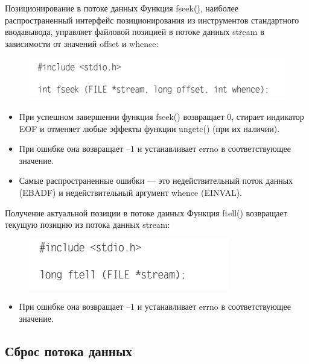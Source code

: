 \documentclass{beamer}
\begin{document}
\begin{frame}{Позиционирование в потоке данных}
Функция fseek(), наиболее распространенный интерфейс позиционирования из инструментов стандартного ввода­вывода,
управляет файловой позицией в потоке данных stream в зависимости от значений offset и whence:
\begin{figure}[h]
\centering
\includegraphics[scale=0.6]{images/lec05-pic22.png}
\end{figure}
\begin{itemize}
\item При успешном завершении функция fseek() возвращает 0, стирает индикатор EOF и отменяет любые эффекты функции ungetc() (при их наличии). 
\item При ошибке она возвращает –1 и устанавливает errno в соответствующее значение. 
\item Самые распространенные ошибки — это недействительный поток данных (EBADF) и недействительный аргумент whence (EINVAL).
\end{itemize}
\end{frame}

\begin{frame}{Получение актуальной позиции в потоке данных}
Функция ftell() возвращает текущую позицию из потока данных stream:
\begin{figure}[h]
\centering
\includegraphics[scale=0.6]{images/lec05-pic23.png}
\end{figure}
\begin{itemize}
\item При ошибке она возвращает –1 и устанавливает errno в соответствующее значение.
\end{itemize}
\end{frame}

\subsection{Сброс потока данных}
\end{document}
